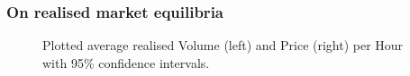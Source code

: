 \begin{subappendices}
\subsubsection{On realised market equilibria}
\begin{figure}[H]
\begin{center} 
\end{center}
\caption{\small Plotted average realised Volume (left) and Price (right) per Hour with 95\% confidence intervals.}
\label{EquilVolPriperHour}
\end{figure}



\end{subappendices}
